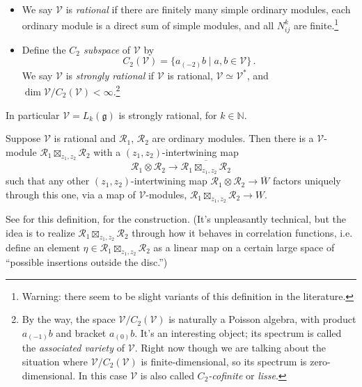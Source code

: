 \documentclass[12pt,letterpaper,reqno]{amsart}
\numberwithin{equation}{section}
\newcommand{\fg}{{\mathfrak g}}
\newcommand{\bbN}{{\mathbb N}}
\newcommand{\vertex}{\mathcal{V}}
\newcommand{\vrep}{\mathcal{R}}
\newcommand{\ti}[1]{\textit{#1}}
\begin{document}
\begin{defn} \ 
\begin{itemize}
\item We say $\vertex$ is \ti{rational} if
there are finitely many simple ordinary modules,
each ordinary module is a direct sum of simple modules,
and all $N_{ij}^k$ are finite.\footnote{Warning: there seem to be slight variants of this definition in the literature.}

\item Define the \ti{$C_2$ subspace} of $\vertex$ by
\begin{equation}
  C_2(\vertex) = \{ a_{(-2)} b \mid a, b \in \vertex \} \, .
\end{equation}
We say $\vertex$ is \ti{strongly rational} if $\vertex$ is rational,
$\vertex \simeq \vertex^*$, and $\dim \vertex / C_2(\vertex) < \infty$.\footnote{By the way, the space $\vertex / C_2(\vertex)$ is naturally a Poisson algebra, with product $a_{(-1)} b$ and bracket $a_{(0)} b$. It's an interesting object; its spectrum is called the \ti{associated variety} of $\vertex$. Right now though we are talking about the situation where 
$\vertex / C_2(\vertex)$ is finite-dimensional, so its
spectrum is zero-dimensional. In this case $\vertex$ is also called
\ti{$C_2$-cofinite} or \ti{lisse}.}
\end{itemize}
\end{defn}

In particular $\vertex = L_k(\fg)$ is strongly rational, for $k \in \bbN$.

\begin{prop}
Suppose $\vertex$ is rational and $\vrep_1$, $\vrep_2$ are ordinary modules.
Then there is a $\vertex$-module $\vrep_1 \boxtimes_{z_1,z_2} \vrep_2$
with a $(z_1,z_2)$-intertwining map
\begin{equation}
 \vrep_1 \otimes \vrep_2 \to \overline{\vrep_1 \boxtimes_{z_1,z_2} \vrep_2} 
\end{equation}
such that any other $(z_1,z_2)$-intertwining 
map $\vrep_1 \otimes \vrep_2 \to \overline{W}$
factors uniquely through this one, via a map of $\vertex$-modules,
$\vrep_1 \boxtimes_{z_1,z_2} \vrep_2 \to W$.
\end{prop}

See \cite{HuangLepowsky1995TensorI} for this definition, \cite{HuangLepowsky1995TensorIII} for the construction.
(It's unpleasantly technical, but the idea is to realize $\vrep_1 \boxtimes_{z_1,z_2} \vrep_2$ through how it behaves in correlation functions,
i.e. define an element $\eta \in \vrep_1 \boxtimes_{z_1,z_2} \vrep_2$ as a linear map on a certain large space of
``possible insertions outside the disc.'')
\end{document}

